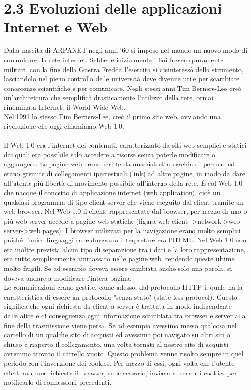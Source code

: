 \documentclass{report}%
\theoremstyle{plain}
\begin{document}
\section*{2.3 Evoluzioni delle applicazioni Internet e Web}
Dalla nascita di ARPANET negli anni '60 si impose nel mondo un nuovo modo di comunicare: la rete internet. Sebbene inizialmente i fini fossero puramente militari, con la fine della Guerra Fredda l'esercito si disinteressò dello strumento, lasciandolo nel pieno controllo delle università dove divenne utile per scambiare conoscenze scientifiche e per comunicare. Negli stessi anni Tim Berners-Lee creò un'architettura che semplificò drasticamente l'utilizzo della rete, ormai rinominata Internet: il World Wide Web.\\Nel 1991  lo stesso Tim Berners-Lee, creò il primo sito web, avviando una rivoluzione che oggi chiamiamo Web 1.0.\\\\
Il Web 1.0 era l'internet dei contenuti, caratterizzato da siti web semplici e statici dai quali era possibile solo accedere a risorse senza poterle modificare o aggiungere. Le pagine web erano scritte da una ristretta cerchia di persone ed erano gremite di collegamenti ipertestuali (link) ad altre pagine, in modo da dare all'utente più libertà di movimento possibile all'interno della rete. È col Web 1.0 che nacque il concetto di applicazione internet (web application), cioè un qualsiasi programma di tipo client-server che viene eseguito dal client tramite un web browser. Nel Web 1.0 il client, rappresentato dal browser, per mezzo di uno o più web server accede a pagine web statiche (figura web client ->network->web server->web pages). I browser utilizzati per la navigazione erano molto semplici poiché l'unico linguaggio che dovevano interpretare era l'HTML. Nel Web 1.0 non era inoltre prevista alcun tipo di separazione tra i dati e la loro rappresentazione, era tutto semplicemente ammassato nelle pagine web, rendendo queste ultime molto fragili. Se ad esempio doveva essere cambiata anche solo una parola, si doveva andare a modificare l'intera pagina.  \\Le comunicazioni erano gestite, come adesso, dal protocollo HTTP il quale ha la caratteristica di essere un protocollo "senza stato" (state-less protocol). Questo significa che ogni richiesta da client a server è trattata in modo indipendente dalle altre e di conseguenza ogni informazione scambiata tra browser e server alla fine della trasmissione viene persa. Se ad esempio avessimo messo qualcosa nel carrello di un qualche sito di acquisti ed avessimo poi navigato su altri siti o chiuso e riaperto il collegamento, una volta tornati al nostro sito di acquisti avremmo trovato il carrello vuoto. Questo problema venne risolto sempre in quel periodo con l'invenzione dei cookies. Per mezzo di essi, ogni volta che l'utente effettuava una richiesta il browser, se necessario, inviava al server i cookies per notificarlo di connessioni precedenti.\\\\
\end{document}
